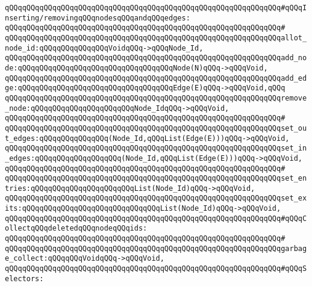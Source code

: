 \verb|qQQqqQQqqQQqqQQqqQQqqQQqqQQqqQQqqQQqqQQqqQQqqQQqqQQqqQQqqQQqqQQq#qQQqInserting/removingqQQqnodesqQQqandqQQqedges:|\newline
\verb|qQQqqQQqqQQqqQQqqQQqqQQqqQQqqQQqqQQqqQQqqQQqqQQqqQQqqQQqqQQqqQQq#|\newline
\verb|qQQqqQQqqQQqqQQqqQQqqQQqqQQqqQQqqQQqqQQqqQQqqQQqqQQqqQQqqQQqqQQqallot_node_id:qQQqqQQqqQQqqQQqVoidqQQq->qQQqNode_Id,|\newline
\verb|qQQqqQQqqQQqqQQqqQQqqQQqqQQqqQQqqQQqqQQqqQQqqQQqqQQqqQQqqQQqqQQqadd_node:qQQqqQQqqQQqqQQqqQQqqQQqqQQqqQQqqQQqNode(N)qQQq->qQQqVoid,|\newline
\verb|qQQqqQQqqQQqqQQqqQQqqQQqqQQqqQQqqQQqqQQqqQQqqQQqqQQqqQQqqQQqqQQqadd_edge:qQQqqQQqqQQqqQQqqQQqqQQqqQQqqQQqqQQqEdge(E)qQQq->qQQqVoid,qQQq|\newline
\verb|qQQqqQQqqQQqqQQqqQQqqQQqqQQqqQQqqQQqqQQqqQQqqQQqqQQqqQQqqQQqqQQqremove_node:qQQqqQQqqQQqqQQqqQQqqQQqNode_IdqQQq->qQQqVoid,|\newline
\verb|qQQqqQQqqQQqqQQqqQQqqQQqqQQqqQQqqQQqqQQqqQQqqQQqqQQqqQQqqQQqqQQq#|\newline
\verb|qQQqqQQqqQQqqQQqqQQqqQQqqQQqqQQqqQQqqQQqqQQqqQQqqQQqqQQqqQQqqQQqset_out_edges:qQQqqQQqqQQqqQQq(Node_Id,qQQqList(Edge(E)))qQQq->qQQqVoid,|\newline
\verb|qQQqqQQqqQQqqQQqqQQqqQQqqQQqqQQqqQQqqQQqqQQqqQQqqQQqqQQqqQQqqQQqset_in_edges:qQQqqQQqqQQqqQQqqQQq(Node_Id,qQQqList(Edge(E)))qQQq->qQQqVoid,|\newline
\verb|qQQqqQQqqQQqqQQqqQQqqQQqqQQqqQQqqQQqqQQqqQQqqQQqqQQqqQQqqQQqqQQq#|\newline
\verb|qQQqqQQqqQQqqQQqqQQqqQQqqQQqqQQqqQQqqQQqqQQqqQQqqQQqqQQqqQQqqQQqset_entries:qQQqqQQqqQQqqQQqqQQqqQQqList(Node_Id)qQQq->qQQqVoid,|\newline
\verb|qQQqqQQqqQQqqQQqqQQqqQQqqQQqqQQqqQQqqQQqqQQqqQQqqQQqqQQqqQQqqQQqset_exits:qQQqqQQqqQQqqQQqqQQqqQQqqQQqqQQqList(Node_Id)qQQq->qQQqVoid,|\newline
\newline
\verb|qQQqqQQqqQQqqQQqqQQqqQQqqQQqqQQqqQQqqQQqqQQqqQQqqQQqqQQqqQQqqQQq#qQQqCollectqQQqdeletedqQQqnodeqQQqids:|\newline
\verb|qQQqqQQqqQQqqQQqqQQqqQQqqQQqqQQqqQQqqQQqqQQqqQQqqQQqqQQqqQQqqQQq#|\newline
\verb|qQQqqQQqqQQqqQQqqQQqqQQqqQQqqQQqqQQqqQQqqQQqqQQqqQQqqQQqqQQqqQQqgarbage_collect:qQQqqQQqVoidqQQq->qQQqVoid,|\newline
\newline
\verb|qQQqqQQqqQQqqQQqqQQqqQQqqQQqqQQqqQQqqQQqqQQqqQQqqQQqqQQqqQQqqQQq#qQQqSelectors:|\newline
